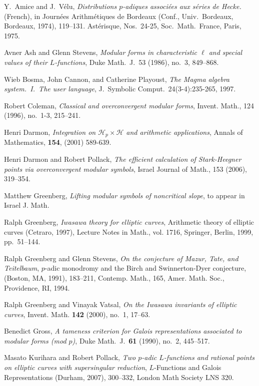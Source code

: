 \documentclass{amsart}
\theoremstyle{plain}
\theoremstyle{definition}
\renewcommand{\H}{\mathcal H}
\begin{document}
\begin{thebibliography}{99}

Y.\ Amice and J.\ V\'elu, \emph{Distributions $p$-adiques associ\'ees aux s\'eries de Hecke.} (French), in Journ\'ees Arithm\'etiques de Bordeaux  (Conf., Univ.\ Bordeaux, Bordeaux, 1974), 119--131. Ast\'erisque, Nos.\ 24-25, Soc.\ Math.\ France, Paris, 1975.

Avner Ash and Glenn Stevens,
\emph{Modular forms in characteristic $\ell$ and special values of their $L$-functions},  Duke Math.\ J.\ 53 (1986), no.\ 3, 849--868. 

Wieb Bosma, John Cannon, and Catherine Playoust, \emph{The Magma algebra system.\ I.\ The user language}, J.\ Symbolic Comput.\, 24(3-4):235-265, 1997.

 Robert Coleman, 
\emph{Classical and overconvergent modular forms},
Invent. Math., 124 (1996), no.~1-3, 215--241. 

 Henri Darmon, 
\emph{Integration on $\H_p \times \H$ and arithmetic applications},
Annals of Mathematics, {\bf 154}, (2001) 589-639.

 Henri Darmon and Robert Pollack,  \emph{The efficient calculation of Stark-Heegner points via overconvergent modular symbols},   Israel Journal of Math., 153 (2006), 319--354.

 Matthew Greenberg,
\emph{Lifting modular symbols of noncritical slope}, to appear in Israel J. Math. 

  Ralph Greenberg,
 \emph{Iwasawa theory for elliptic curves}, Arithmetic theory of
  elliptic curves (Cetraro, 1997), Lecture Notes in Math., vol. 1716, Springer,  Berlin, 1999, pp.~51--144.

  Ralph Greenberg and Glenn Stevens, 
\emph{On the conjecture of Mazur, Tate, and Teitelbaum},  $p$-adic monodromy and the Birch and Swinnerton-Dyer conjecture, (Boston, MA, 1991),  183--211,
Contemp. Math., 165, Amer. Math. Soc., Providence, RI, 1994. 

Ralph Greenberg and Vinayak Vatsal, \emph{On the {I}wasawa invariants of elliptic curves}, Invent. Math. \textbf{142} (2000), no.~1, 17--63.

Benedict Gross, \emph{A tameness criterion for {G}alois representations  associated to modular forms (mod {$p$})}, Duke Math.\ J.\ \textbf{61} (1990), no.~2, 445--517.

Masato Kurihara and Robert Pollack, \emph{Two $p$-adic $L$-functions and rational points on elliptic curves with supersingular reduction},      $L$-Functions and Galois Representations (Durham, 2007), 300--332, London Math Society LNS 320.


\end{thebibliography}
\end{document}

